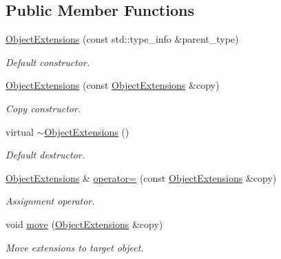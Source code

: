 \subsection*{Public Member Functions}
\begin{DoxyCompactItemize}
\item 
\hyperlink{class_d_d4hep_1_1_object_extensions_adb8a89136b702583d0fa502218592696}{ObjectExtensions} (const std::type\_\-info \&parent\_\-type)
\begin{DoxyCompactList}\small\item\em Default constructor. \item\end{DoxyCompactList}\item 
\hyperlink{class_d_d4hep_1_1_object_extensions_aabd85a7246f24434443c1bb739b6bdbc}{ObjectExtensions} (const \hyperlink{class_d_d4hep_1_1_object_extensions}{ObjectExtensions} \&copy)
\begin{DoxyCompactList}\small\item\em Copy constructor. \item\end{DoxyCompactList}\item 
virtual \hyperlink{class_d_d4hep_1_1_object_extensions_a95f9b15025fc24b02bbda235ed888f4d}{$\sim$ObjectExtensions} ()
\begin{DoxyCompactList}\small\item\em Default destructor. \item\end{DoxyCompactList}\item 
\hyperlink{class_d_d4hep_1_1_object_extensions}{ObjectExtensions} \& \hyperlink{class_d_d4hep_1_1_object_extensions_a14ffdd10b622fdfebd42a45ca2fd42c0}{operator=} (const \hyperlink{class_d_d4hep_1_1_object_extensions}{ObjectExtensions} \&copy)
\begin{DoxyCompactList}\small\item\em Assignment operator. \item\end{DoxyCompactList}\item 
void \hyperlink{class_d_d4hep_1_1_object_extensions_ab7062b99ac80518aa1b70da47a5d001a}{move} (\hyperlink{class_d_d4hep_1_1_object_extensions}{ObjectExtensions} \&copy)
\begin{DoxyCompactList}\small\item\em Move extensions to target object. \item\end{DoxyCompactList}\item 

\end{DoxyCompactItemize}
